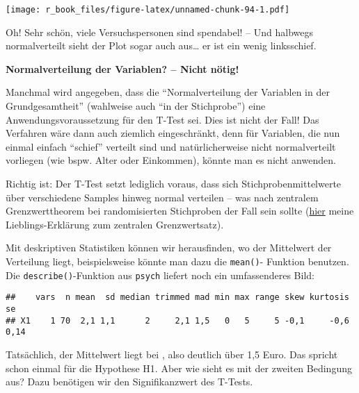 \documentclass[
]{book}
\newenvironment{Shaded}{\begin{snugshade}}{\end{snugshade}}
\newcommand{\FunctionTok}[1]{\textcolor[rgb]{0.00,0.00,0.00}{#1}}
\newcommand{\NormalTok}[1]{#1}
\newcommand{\SpecialCharTok}[1]{\textcolor[rgb]{0.00,0.00,0.00}{#1}}
\begin{document}
\texttt{[image: r\_book\_files/figure-latex/unnamed-chunk-94-1.pdf]}

Oh! Sehr schön, viele Versuchspersonen sind spendabel! -- Und halbwegs normalverteilt sieht der Plot sogar auch aus\ldots{} er ist ein wenig linksschief.

\leavevmode\hypertarget{info_levene}{}%
\textbf{Normalverteilung der Variablen? -- Nicht nötig!}

Manchmal wird angegeben, dass die ``Normalverteilung der Variablen in der Grundgesamtheit'' (wahlweise auch ``in der Stichprobe'') eine Anwendungsvoraussetzung für den T-Test sei. Dies ist nicht der Fall! Das Verfahren wäre dann auch ziemlich eingeschränkt, denn für Variablen, die nun einmal einfach ``schief'' verteilt sind und natürlicherweise nicht normalverteilt vorliegen (wie bspw. Alter oder Einkommen), könnte man es nicht anwenden.

Richtig ist: Der T-Test setzt lediglich voraus, dass sich Stichprobenmittelwerte über verschiedene Samples hinweg normal verteilen -- was nach zentralem Grenzwerttheorem bei randomisierten Stichproben der Fall sein sollte (\href{https://www.youtube.com/watch?v=jvoxEYmQHNM}{hier} meine Lieblings-Erklärung zum zentralen Grenzwertsatz).

Mit deskriptiven Statistiken können wir herausfinden, wo der Mittelwert der Verteilung liegt, beispielsweise könnte man dazu die \texttt{mean()}- Funktion benutzen. Die \texttt{describe()}-Funktion aus \texttt{psych} liefert noch ein umfassenderes Bild:

\begin{Shaded}
\end{Shaded}

\begin{verbatim}
##    vars  n mean  sd median trimmed mad min max range skew kurtosis   se
## X1    1 70  2,1 1,1      2     2,1 1,5   0   5     5 -0,1     -0,6 0,14
\end{verbatim}

Tatsächlich, der Mittelwert liegt bei , also deutlich über 1,5 Euro. Das spricht schon einmal für die Hypothese H1. Aber wie sieht es mit der zweiten Bedingung aus? Dazu benötigen wir den Signifikanzwert des T-Tests.
\end{document}
